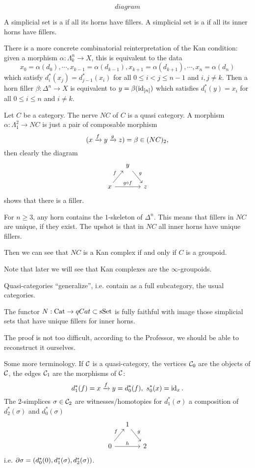 \[diagram\]

A simplicial set is a  if all its horns have fillers. A simplicial set is a  if all its inner horns have fillers.

There is a more concrete combinatorial reinterpretation of the Kan condition: given a morphism $\alpha:\Lambda^n_k\to X$, this is equivalent to the data
\[x_0=\alpha(d_0),\cdots,x_{k-1}=\alpha(d_{k-1}),x_{k+1}=\alpha(d_{k+1}),\cdots,x_n=\alpha(d_n)\]
which satisfy $d_i^*(x_j)=d_{j-1}^*(x_i)$ for all $0\le i<j\le n-1$ and $i,j\ne k$. Then a horn filler $\beta:\Delta^n\to X$ is equivalent to $y=\beta(\operatorname{id}_{[n]})$ which satisfies $d_i^*(y)=x_i$ for all $0\le i\le n$ and $i\ne k$.

\begin{example}
Let $C$ be a category. The nerve $NC$ of $C$ is a quasi category. A morphism $\alpha:\Lambda^2_1\to NC$ is just a pair of composable morphism
\[(x\xrightarrow{f}y\xrightarrow{g}z)=\beta\in (NC)_2,\]
then clearly the diagram
\[
\begin{tikzcd}[column sep=small]
& y \ar[dr,"g"] & \\
x \ar[ur,"f"] \ar[rr,"g\circ f"] & & z
\end{tikzcd}
\]
shows that there is a filler.

For $n\ge3$, any horn contains the $1$-skeleton of $\Delta^n$. This means that fillers in $NC$ are unique, if they exist. The upshot is that in $NC$ all inner horns have unique fillers.

Then we can see that $NC$ is a Kan complex if and only if $C$ is a groupoid.

Note that later we will see that Kan complexes are the $\infty$-groupoids.
\end{example}

Quasi-categories \enquote{generalize}, i.e. contain as a full subcategory, the usual categories.

\begin{proposition}
The functor $N:{\mathrm{Cat}}\to qCat\subset{\mathrm{sSet}}$ is fully faithful with image those simplicial sets that have unique fillers for inner horns.
\end{proposition}

The proof is not too difficult, according to the Professor, we should be able to reconstruct it ourselves.

Some more terminology. If $\mathcal{C}$ is a quasi-category, the vertices $\mathcal{C}_0$ are the objects of $\mathcal{C}$, the edges $\mathcal{C}_1$ are the morphisms of $\mathcal{C}$:
\[d_1^*(f)=x\xrightarrow{f}y=d_0^*(f),\  s_0^*(x)=\operatorname{id}_x.\]
The $2$-simplices $\sigma\in\mathcal{C}_2$ are witnesses/homotopies for $d_1^*(\sigma)$ a composition of $d_2^*(\sigma)$ and $d_0^*(\sigma)$
\[
\begin{tikzcd}[column sep=small]
& 1 \ar[dr,"g"] & \\
0 \ar[ur,"f"] \ar[rr,"h"] & & 2
\end{tikzcd}
\]
i.e. $\partial\sigma=(d_0^*(0),d_1^*(\sigma),d_2^*(\sigma))$.

